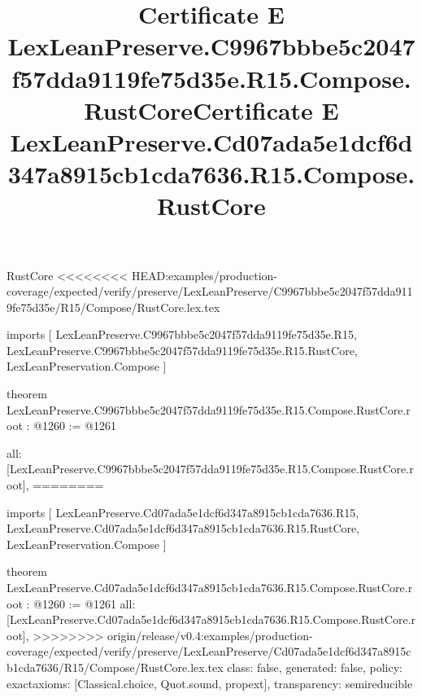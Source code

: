 \begin{lexlean}{RustCore}
<<<<<<<< HEAD:examples/production-coverage/expected/verify/preserve/LexLeanPreserve/C9967bbbe5c2047f57dda9119fe75d35e/R15/Compose/RustCore.lex.tex
\title{Certificate E LexLeanPreserve.C9967bbbe5c2047f57dda9119fe75d35e.R15.Compose.RustCore}
\begin{coremodule}
imports [
  LexLeanPreserve.C9967bbbe5c2047f57dda9119fe75d35e.R15,
  LexLeanPreserve.C9967bbbe5c2047f57dda9119fe75d35e.R15.RustCore,
  LexLeanPreservation.Compose
]

theorem LexLeanPreserve.C9967bbbe5c2047f57dda9119fe75d35e.R15.Compose.RustCore.root : @1260 := @1261 {
  all: [LexLeanPreserve.C9967bbbe5c2047f57dda9119fe75d35e.R15.Compose.RustCore.root],
========
\title{Certificate E LexLeanPreserve.Cd07ada5e1dcf6d347a8915cb1cda7636.R15.Compose.RustCore}
\begin{coremodule}
imports [
  LexLeanPreserve.Cd07ada5e1dcf6d347a8915cb1cda7636.R15,
  LexLeanPreserve.Cd07ada5e1dcf6d347a8915cb1cda7636.R15.RustCore,
  LexLeanPreservation.Compose
]

theorem LexLeanPreserve.Cd07ada5e1dcf6d347a8915cb1cda7636.R15.Compose.RustCore.root : @1260 := @1261 {
  all: [LexLeanPreserve.Cd07ada5e1dcf6d347a8915cb1cda7636.R15.Compose.RustCore.root],
>>>>>>>> origin/release/v0.4:examples/production-coverage/expected/verify/preserve/LexLeanPreserve/Cd07ada5e1dcf6d347a8915cb1cda7636/R15/Compose/RustCore.lex.tex
  class: false,
  generated: false,
  policy: exact{axioms: [Classical.choice, Quot.sound, propext]},
  transparency: semireducible
}


\end{coremodule}}
\end{coremodule}
\end{lexlean}
